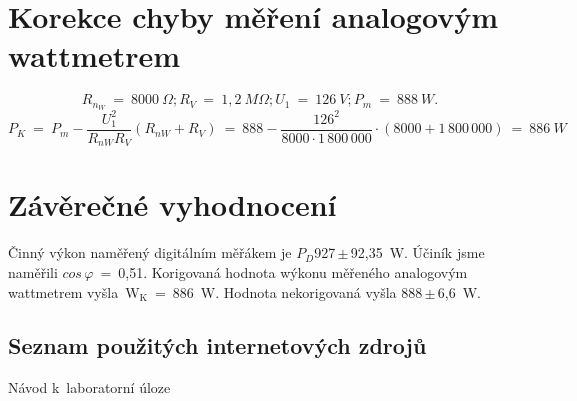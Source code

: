 \documentclass[a4paper,12pt]{article}   %
\begin{document}
\section{Korekce chyby měření analogovým wattmetrem}
\begin{equation*}
  R_{n_W}~=~8000~\Omega; R_V~=~1,2~M\Omega; U_1~=~126~V; P_m~=~888~W.
\end{equation*}
\begin{equation*}
  P_K~=~P_m - \frac{U_1^2}{R_{nW}R_V}(R_{nW} + R_V)~=~888 - \frac{126^2}{8000\cdot 1\,800\,000}\cdot (8000 + 1\,800\,000)~=~886~W
\end{equation*}

\section{Závěrečné vyhodnocení}
Činný výkon naměřený digitálním měřákem je $P_D$927\,$\pm$\,92,35~W. Účiník jsme naměřili $cos\,\varphi$~=~0,51. Korigovaná hodnota wýkonu měřeného analogovým wattmetrem vyšla~W$_\textrm{K}$~=~886~W. Hodnota nekorigovaná vyšla 888\,$\pm$\,6,6~W.

\clearpage
\renewcommand{\refname}{Seznam použité literatury a~zdrojů informací} 

\begin{thebibliography}{99}

\subsection*{Seznam použitých internetových zdrojů}
     Návod k~laboratorní úloze
    
\end{thebibliography}
\end{document}

